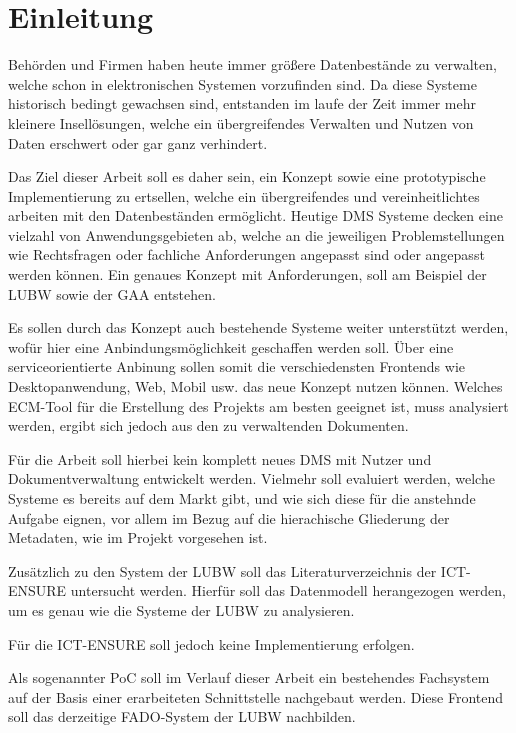\section{Einleitung} \label{Einfuehrung}
Beh\"orden und Firmen haben heute immer gr\"o\ss{}ere Datenbest\"ande zu verwalten, welche schon in elektronischen Systemen vorzufinden sind. Da diese Systeme historisch bedingt gewachsen sind, entstanden im laufe der Zeit immer mehr kleinere Insell\"osungen, welche ein \"ubergreifendes Verwalten und Nutzen von Daten erschwert oder gar ganz verhindert.

Das Ziel dieser Arbeit soll es daher sein, ein Konzept sowie eine prototypische Implementierung zu ertsellen, welche ein \"ubergreifendes und vereinheitlichtes arbeiten mit den Datenbest\"anden erm\"oglicht. Heutige \ac{DMS} Systeme decken eine vielzahl von Anwendungsgebieten ab, welche an die jeweiligen Problemstellungen wie Rechtsfragen oder fachliche Anforderungen angepasst sind oder angepasst werden k\"onnen.
Ein genaues Konzept mit Anforderungen, soll am Beispiel der \ac{LUBW} sowie der \ac{GAA} entstehen.
\cite{Dokumenten-Management}

Es sollen durch das Konzept auch bestehende Systeme weiter unterst\"utzt werden, wof\"ur hier eine Anbindungsm\"oglichkeit geschaffen werden soll. \"Uber eine serviceorientierte Anbinung sollen somit die verschiedensten Frontends wie Desktopanwendung, Web, Mobil usw. das neue Konzept nutzen k\"onnen. Welches \ac{ECM}-Tool f\"ur die Erstellung des Projekts am besten geeignet ist, muss analysiert werden, ergibt sich jedoch aus den zu verwaltenden Dokumenten.

F\"ur die Arbeit soll hierbei kein komplett neues \ac{DMS} mit Nutzer und Dokumentverwaltung entwickelt werden. Vielmehr soll evaluiert werden, welche Systeme es bereits auf dem Markt gibt, und wie sich diese f\"ur die anstehnde Aufgabe eignen, vor allem im Bezug auf die hierachische Gliederung der Metadaten, wie im Projekt vorgesehen ist. 

Zus\"atzlich zu den System der \ac{LUBW} soll das Literaturverzeichnis der \ac{ICT-ENSURE} untersucht werden. Hierf\"ur soll das Datenmodell herangezogen werden, um es genau wie die Systeme der \ac{LUBW} zu analysieren. 

F\"ur die \ac{ICT-ENSURE} soll jedoch keine Implementierung erfolgen.

Als sogenannter \ac{PoC} soll im Verlauf dieser Arbeit ein bestehendes Fachsystem auf der Basis einer erarbeiteten Schnittstelle nachgebaut werden. Diese Frontend soll das derzeitige \ac{FADO}-System der \ac{LUBW} nachbilden.